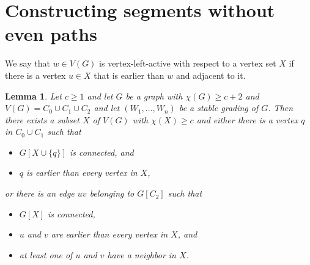 \documentclass{article}
\newtheorem{lemma}[theorem]{Lemma}
\begin{document}
\section{Constructing segments without even paths}
\label{sec:segments_even}

We say that $w \in V(G)$ is vertex-left-active with respect to a vertex set $X$ if there is a vertex $u \in X$ that is earlier than $w$ and adjacent to it.

\begin{lemma}\label{lemma1:quasi}
    Let $c \geq 1$ and let $G$ be a graph with $\chi(G) \geq c + 2$ and $V(G) = C_0 \cup C_1 \cup C_2$ and let $(W_1, \dots, W_n)$ be a stable grading of $G$.
    Then there exists a subset $X$ of $V(G)$ with $\chi(X) \geq c$ and either there is a vertex $q$ in $C_0 \cup C_1$ such that 
    \begin{itemize}
        \item $G[X \cup \{q\}]$ is connected, and
        \item $q$ is earlier than every vertex in $X$,
    \end{itemize}
    or there is an edge $uv$ belonging to $G[C_2]$ such that 
    \begin{itemize}
        \item $G[X]$ is connected,
        \item $u$ and $v$ are earlier than every vertex in $X$, and
        \item at least one of $u$ and $v$ have a neighbor in $X$.
    \end{itemize}
\end{lemma}
\end{document}
